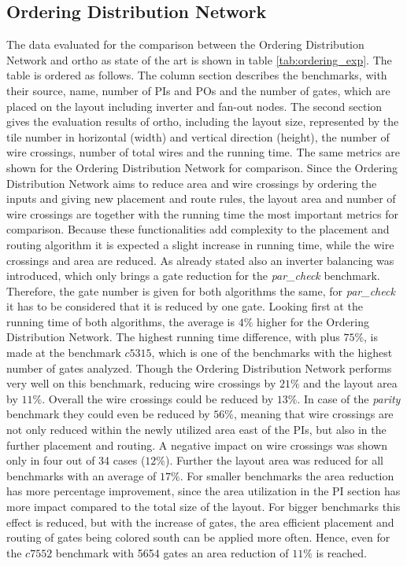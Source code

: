 \subsection{Ordering Distribution Network}
The data evaluated for the comparison between the Ordering Distribution Network and ortho as state of the art is shown in table \ref{tab:ordering_exp}. The table is ordered as follows. The column section describes the benchmarks, with their source, name, number of PIs and POs and the number of gates, which are placed on the layout including inverter and fan-out nodes. The second section gives the evaluation results of ortho, including the layout size, represented by the tile number in horizontal (width) and vertical direction (height), the number of wire crossings, number of total wires and the running time. The same metrics are shown for the Ordering Distribution Network for comparison.
Since the Ordering Distribution Network aims to reduce area and wire crossings by ordering the inputs and giving new placement and route rules, the layout area and number of wire crossings are together with the running time the most important metrics for comparison. Because these functionalities add complexity to the placement and routing algorithm it is expected a slight increase in running time, while the wire crossings and area are reduced. As already stated also an inverter balancing was introduced, which only brings a gate reduction for the \textit{par\_check} benchmark. Therefore, the gate number is given for both algorithms the same, for \textit{par\_check} it has to be considered that it is reduced by one gate. Looking first at the running time of both algorithms, the average is $4\%$ higher for the Ordering Distribution Network. The highest running time difference, with plus $75\%$, is made at the benchmark $c5315$, which is one of the benchmarks with the highest number of gates analyzed. Though the Ordering Distribution Network performs very well on this benchmark, reducing wire crossings by $21\%$ and the layout area by $11\%$. Overall the wire crossings could be reduced by $13\%$. In case of the \textit{parity} benchmark they could even be reduced by $56\%$, meaning that wire crossings are not only reduced within the newly utilized area east of the PIs, but also in the further placement and routing. A negative impact on wire crossings was shown only in four out of 34 cases ($12\%$). Further the layout area was reduced for all benchmarks with an average of $17\%$. For smaller benchmarks the area reduction has more percentage improvement, since the area utilization in the PI section has more impact compared to the total size of the layout. For bigger benchmarks this effect is reduced, but with the increase of gates, the area efficient placement and routing of gates being colored south can be applied more often. Hence, even for the $c7552$ benchmark with 5654 gates an area reduction of $11\%$ is reached.
 
